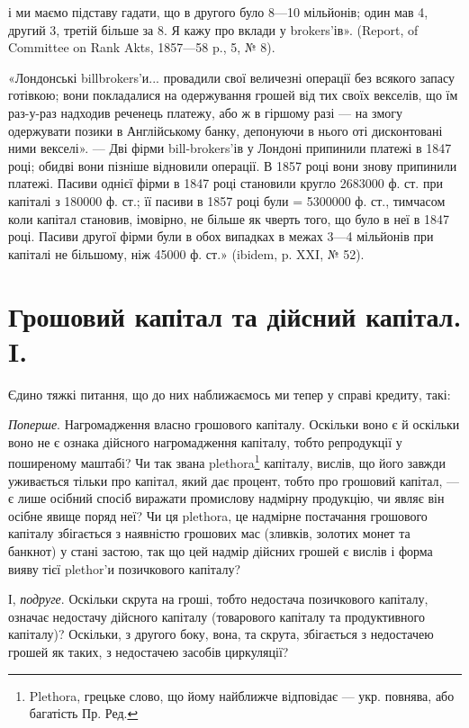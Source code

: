 \parcont{}  %
і ми маємо підставу гадати, що в другого було 8—10 мільйонів; один мав 4,
другий 3, третій більше за 8. Я кажу про вклади у brokers’ів». (Report,
of Committee on Rank Akts, 1857—58 p., 5, № 8).

«Лондонські billbrokers’и... провадили свої величезні операції без всякого
запасу готівкою; вони покладалися на одержування грошей від тих своїх векселів,
що їм раз-у-раз надходив реченець платежу, або ж в гіршому разі — на змогу
одержувати позики в Англійському банку, депонуючи в нього оті дисконтовані
ними векселі». — Дві фірми bill-brokers’ів у Лондоні припинили платежі в
1847 році; обидві вони пізніше відновили операції. В 1857 році вони знову
припинили платежі. Пасиви однієї фірми в 1847 році становили кругло
2683000 ф. ст. при капіталі з 180000 ф. ст.; її пасиви в 1857 році були =
5300000 ф. ст., тимчасом коли капітал становив, імовірно, не більше як чверть
того, що було в неї в 1847 році. Пасиви другої фірми були в обох випадках
в межах 3—4 мільйонів при капіталі не більшому, ніж 45000 ф. ст.» (ibidem,
p. XXI, № 52).

\section{Грошовий капітал та дійсний капітал. I.}

Єдино тяжкі питання, що до них наближаємось ми тепер у справі кредиту,
такі:

\emph{Поперше}. Нагромадження власно грошового капіталу. Оскільки воно
є й оскільки воно не є ознака дійсного нагромадження капіталу, тобто репродукції
у поширеному маштабі? Чи так звана plethora\footnote*{
Plethora, грецьке слово, що йому найближче відповідає — укр. повнява, або багатість Пр. Ред.
} капіталу, вислів, що його
завжди уживається тільки про капітал, який дає процент, тобто про грошовий
капітал, — є лише осібний спосіб виражати промислову надмірну продукцію,
чи являє він осібне явище поряд неї? Чи ця plethora, це надмірне постачання
грошового капіталу збігається з наявністю грошових мас (зливків,
золотих монет та банкнот) у стані застою, так що цей надмір дійсних грошей
є вислів і форма вияву тієї plethor’и позичкового капіталу?

І, \emph{подруге}. Оскільки скрута на гроші, тобто недостача позичкового капіталу,
означає недостачу дійсного капіталу (товарового капіталу та продуктивного
капіталу)? Оскільки, з другого боку, вона, та скрута, збігається з недостачею
грошей як таких, з недостачею засобів циркуляції?

